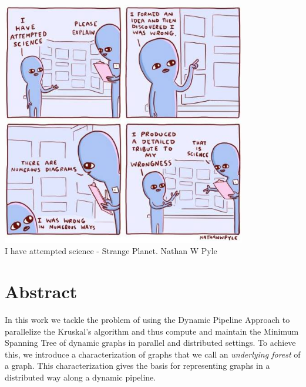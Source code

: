 

\newpage
\thispagestyle{plain}
\begin{flushright}
    \includegraphics[width=0.8\textwidth]{figures/science.jpg}\\
    I have attempted science - Strange Planet. Nathan W Pyle
\end{flushright}

\newpage

\chapter*{Abstract}
In this work we tackle the problem of using the Dynamic Pipeline Approach to parallelize the Kruskal’s algorithm and thus compute and maintain the Minimum Spanning Tree of dynamic graphs in parallel and distributed settings. To achieve this, we introduce a characterization of  graphs that we call an \emph{underlying forest} of a graph. This characterization gives the basis for representing graphs  in a distributed way along a dynamic pipeline. 

